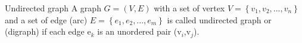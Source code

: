 \documentclass{beamer}
\begin{document}
\begin{frame}[fragile]
    \begin{block}{Undirected graph}  
        A graph  $G=(V,E)$ with a set of vertex $V=\left \{ v_{1},v_{2}, ... ,v_{n} \right \}$ and a set of edge (arc) $E=\left \{ e_{1},e_{2}, ... ,e_{m} \right \}$ is called undirected graph or (digraph) if each edge e$_{k}$ is an unordered pair (v$_{i}$,v$_{j}$).

    \end{block} 
\end{frame}
\end{document}
